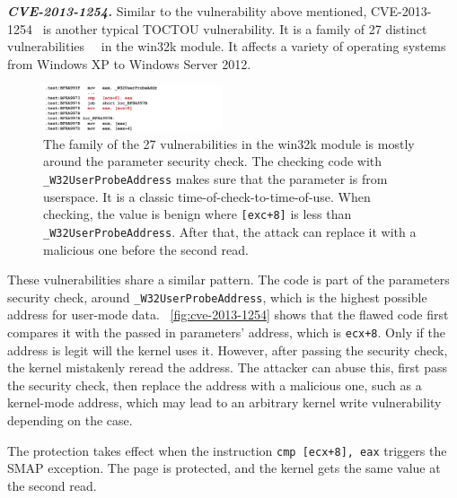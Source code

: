 \textbf{\textit{CVE-2013-1254.}} Similar to the vulnerability above mentioned, CVE-2013-1254~\cite{CVE-2013-1254} is another typical TOCTOU vulnerability. It is a family of 27 distinct vulnerabilities~\cite{ms13016}~\cite{jurczyk2013identifying} in the win32k module. It affects a variety of operating systems from Windows XP to Windows Server 2012.

\begin{figure}[th]
  \includegraphics[width=0.47\textwidth]{figures/cve-2013-1254}
  \centering
  \caption{The family of the 27 vulnerabilities in the win32k module is mostly around the parameter security check. The checking code with \texttt{\_W32UserProbeAddress} makes sure that the parameter is from userspace. It is a classic time-of-check-to-time-of-use. When checking, the value is benign where \texttt{[exc+8]} is less than \texttt{\_W32UserProbeAddress}. After that, the attack can replace it with a malicious one before the second read.}
  \label{fig:cve-2013-1254}
\end{figure}



These vulnerabilities share a similar pattern. The code is part of the parameters security check, around \texttt{\_W32UserProbeAddress}, which is the highest possible address for user-mode data. ~\autoref{fig:cve-2013-1254} shows that the flawed code first compares it with the passed in parameters' address, which is \texttt{ecx+8}. Only if the address is legit will the kernel uses it. However, after passing the security check, the kernel mistakenly reread the address. The attacker can abuse this, first pass the security check, then replace the address with a malicious one, such as a kernel-mode address, which may lead to an arbitrary kernel write vulnerability depending on the case.

The protection takes effect when the instruction \texttt{cmp [ecx+8], eax} triggers the SMAP exception. The page is protected, and the kernel gets the same value at the second read.
